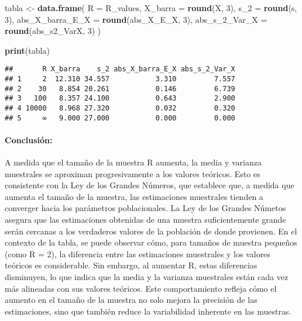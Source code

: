\documentclass[
]{article}
\newenvironment{Shaded}{\begin{snugshade}}{\end{snugshade}}
\newcommand{\AttributeTok}[1]{\textcolor[rgb]{0.13,0.29,0.53}{#1}}
\newcommand{\DecValTok}[1]{\textcolor[rgb]{0.00,0.00,0.81}{#1}}
\newcommand{\FunctionTok}[1]{\textcolor[rgb]{0.13,0.29,0.53}{\textbf{#1}}}
\newcommand{\NormalTok}[1]{#1}
\newcommand{\OtherTok}[1]{\textcolor[rgb]{0.56,0.35,0.01}{#1}}
\begin{document}
\begin{Shaded}
\begin{Highlighting}[]
\NormalTok{tabla }\OtherTok{\textless{}{-}} \FunctionTok{data.frame}\NormalTok{(}
  \AttributeTok{R =}\NormalTok{ R\_values,}
  \AttributeTok{X\_barra =} \FunctionTok{round}\NormalTok{(X, }\DecValTok{3}\NormalTok{),}
  \AttributeTok{s\_2 =} \FunctionTok{round}\NormalTok{(s, }\DecValTok{3}\NormalTok{),}
  \AttributeTok{abs\_X\_barra\_E\_X =} \FunctionTok{round}\NormalTok{(abs\_X\_E\_X, }\DecValTok{3}\NormalTok{),}
  \AttributeTok{abs\_s\_2\_Var\_X =} \FunctionTok{round}\NormalTok{(abs\_s2\_VarX, }\DecValTok{3}\NormalTok{)}
\NormalTok{)}

\FunctionTok{print}\NormalTok{(tabla)}
\end{Highlighting}
\end{Shaded}

\begin{verbatim}
##       R X_barra    s_2 abs_X_barra_E_X abs_s_2_Var_X
## 1     2  12.310 34.557           3.310         7.557
## 2    30   8.854 20.261           0.146         6.739
## 3   100   8.357 24.100           0.643         2.900
## 4 10000   8.968 27.320           0.032         0.320
## 5     ∞   9.000 27.000           0.000         0.000
\end{verbatim}

\paragraph{Conclusión:}\label{conclusiuxf3n}

A medida que el tamaño de la muestra R aumenta, la media y varianza
muestrales se aproximan progresivamente a los valores teóricos. Esto es
consistente con la Ley de los Grandes Números, que establece que, a
medida que aumenta el tamaño de la muestra, las estimaciones muestrales
tienden a converger hacia los parámetros poblacionales. La Ley de los
Grandes Númetos asegura que las estimaciones obtenidas de una muestra
suficientemente grande serán cercanas a los verdaderos valores de la
población de donde provienen. En el contexto de la tabla, se puede
observar cómo, para tamaños de muestra pequeños (como R = 2), la
diferencia entre las estimaciones muestrales y los valores teóricos es
considerable. Sin embargo, al aumentar R, estas diferencias disminuyen,
lo que indica que la media y la varianza muestrales están cada vez más
alineadas con sus valores teóricos. Este comportamiento refleja cómo el
aumento en el tamaño de la muestra no solo mejora la precisión de las
estimaciones, sino que también reduce la variabilidad inherente en las
muestras.
\end{document}
